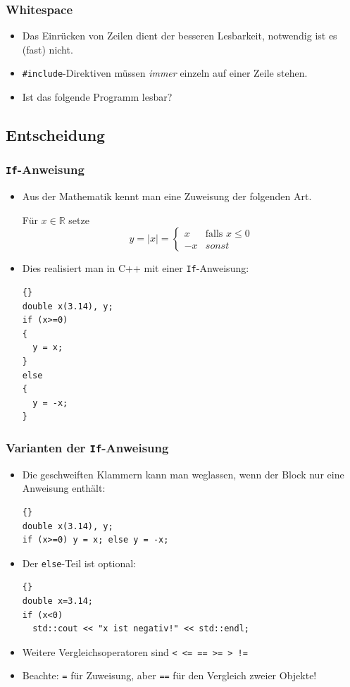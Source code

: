 \documentclass[ignorenonframetext,12pt]{beamer}
\theoremstyle{definition}
\theoremstyle{definition}
\begin{document}
\begin{frame}[fragile]
\frametitle{Whitespace}
\begin{itemize}
\item Das Einrücken von Zeilen dient der besseren Lesbarkeit,
  notwendig ist es (fast) nicht.
\item \lstinline{#include}-Direktiven müssen \textsl{immer} einzeln
  auf einer Zeile stehen.
\item Ist das folgende Programm lesbar?

\end{itemize}
\end{frame}

\subsection{Entscheidung}

\begin{frame}[fragile]
\frametitle{\lstinline{If}-Anweisung}
\begin{itemize}
\item Aus der Mathematik kennt man eine \glqq{}Zuweisung\grqq{} der
  folgenden Art.

Für $x\in\mathbb{R}$ setze
\begin{equation*}
y = |x| = \left\{\begin{array}{ll}
x & \text{falls $x\leq 0$}\\
-x & sonst
\end{array}\right.
\end{equation*}
\item Dies realisiert man in C++ mit einer \lstinline{If}-Anweisung:
{\scriptsize\begin{lstlisting}{}
double x(3.14), y;
if (x>=0)
{
  y = x;
}
else
{
  y = -x;
}
\end{lstlisting}}
\end{itemize}
\end{frame}

\begin{frame}[fragile]
\frametitle{Varianten der \lstinline{If}-Anweisung}
\begin{itemize}
\item Die geschweiften Klammern kann man weglassen, wenn der Block nur
  eine Anweisung enthält:
{\scriptsize\begin{lstlisting}{}
double x(3.14), y;
if (x>=0) y = x; else y = -x;
\end{lstlisting}}
\item Der \lstinline{else}-Teil ist optional:
{\scriptsize\begin{lstlisting}{}
double x=3.14;
if (x<0)
  std::cout << "x ist negativ!" << std::endl;
\end{lstlisting}}
\item Weitere Vergleichsoperatoren sind \lstinline{< <= == >= > !=}\\
\item Beachte: \lstinline{=} für Zuweisung, aber \lstinline{==} für den
Vergleich zweier Objekte!
\end{itemize}
\end{frame}
\end{document}
